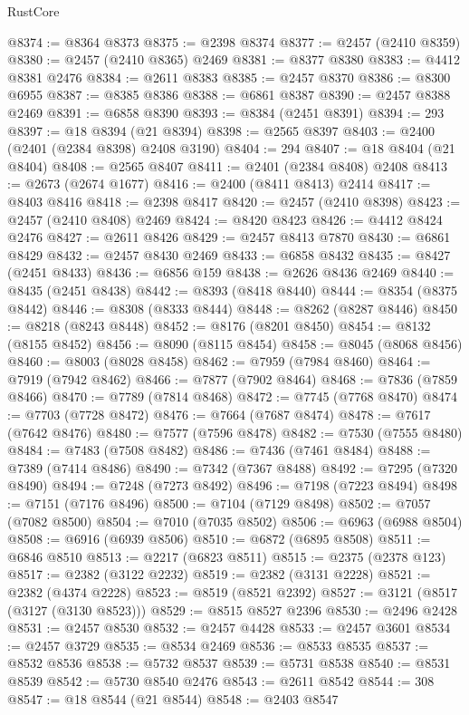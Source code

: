 \begin{lexlean}{RustCore}
\begin{coremodule}
@8374 := @8364 @8373
@8375 := @2398 @8374
@8377 := @2457 (@2410 @8359)
@8380 := @2457 (@2410 @8365) @2469
@8381 := @8377 @8380
@8383 := @4412 @8381 @2476
@8384 := @2611 @8383
@8385 := @2457 @8370
@8386 := @8300 @6955
@8387 := @8385 @8386
@8388 := @6861 @8387
@8390 := @2457 @8388 @2469
@8391 := @6858 @8390
@8393 := @8384 (@2451 @8391)
@8394 := 293
@8397 := @18 @8394 (@21 @8394)
@8398 := @2565 @8397
@8403 := @2400 (@2401 (@2384 @8398) @2408 @3190)
@8404 := 294
@8407 := @18 @8404 (@21 @8404)
@8408 := @2565 @8407
@8411 := @2401 (@2384 @8408) @2408
@8413 := @2673 (@2674 @1677)
@8416 := @2400 (@8411 @8413) @2414
@8417 := @8403 @8416
@8418 := @2398 @8417
@8420 := @2457 (@2410 @8398)
@8423 := @2457 (@2410 @8408) @2469
@8424 := @8420 @8423
@8426 := @4412 @8424 @2476
@8427 := @2611 @8426
@8429 := @2457 @8413 @7870
@8430 := @6861 @8429
@8432 := @2457 @8430 @2469
@8433 := @6858 @8432
@8435 := @8427 (@2451 @8433)
@8436 := @6856 @159
@8438 := @2626 @8436 @2469
@8440 := @8435 (@2451 @8438)
@8442 := @8393 (@8418 @8440)
@8444 := @8354 (@8375 @8442)
@8446 := @8308 (@8333 @8444)
@8448 := @8262 (@8287 @8446)
@8450 := @8218 (@8243 @8448)
@8452 := @8176 (@8201 @8450)
@8454 := @8132 (@8155 @8452)
@8456 := @8090 (@8115 @8454)
@8458 := @8045 (@8068 @8456)
@8460 := @8003 (@8028 @8458)
@8462 := @7959 (@7984 @8460)
@8464 := @7919 (@7942 @8462)
@8466 := @7877 (@7902 @8464)
@8468 := @7836 (@7859 @8466)
@8470 := @7789 (@7814 @8468)
@8472 := @7745 (@7768 @8470)
@8474 := @7703 (@7728 @8472)
@8476 := @7664 (@7687 @8474)
@8478 := @7617 (@7642 @8476)
@8480 := @7577 (@7596 @8478)
@8482 := @7530 (@7555 @8480)
@8484 := @7483 (@7508 @8482)
@8486 := @7436 (@7461 @8484)
@8488 := @7389 (@7414 @8486)
@8490 := @7342 (@7367 @8488)
@8492 := @7295 (@7320 @8490)
@8494 := @7248 (@7273 @8492)
@8496 := @7198 (@7223 @8494)
@8498 := @7151 (@7176 @8496)
@8500 := @7104 (@7129 @8498)
@8502 := @7057 (@7082 @8500)
@8504 := @7010 (@7035 @8502)
@8506 := @6963 (@6988 @8504)
@8508 := @6916 (@6939 @8506)
@8510 := @6872 (@6895 @8508)
@8511 := @6846 @8510
@8513 := @2217 (@6823 @8511)
@8515 := @2375 (@2378 @123)
@8517 := @2382 (@3122 @2232)
@8519 := @2382 (@3131 @2228)
@8521 := @2382 (@4374 @2228)
@8523 := @8519 (@8521 @2392)
@8527 := @3121 (@8517 (@3127 (@3130 @8523)))
@8529 := @8515 @8527 @2396
@8530 := @2496 @2428
@8531 := @2457 @8530
@8532 := @2457 @4428
@8533 := @2457 @3601
@8534 := @2457 @3729
@8535 := @8534 @2469
@8536 := @8533 @8535
@8537 := @8532 @8536
@8538 := @5732 @8537
@8539 := @5731 @8538
@8540 := @8531 @8539
@8542 := @5730 @8540 @2476
@8543 := @2611 @8542
@8544 := 308
@8547 := @18 @8544 (@21 @8544)
@8548 := @2403 @8547

\end{coremodule}
\end{lexlean}
